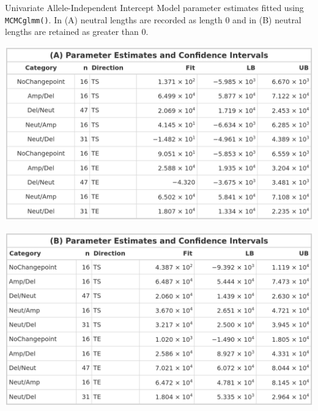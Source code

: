 \begin{table}[!htb]
    \caption[Univariate Allele-Independent Intercept Model parameter estimates fitted using \texttt{MCMCglmm()}.]{Univariate Allele-Independent Intercept Model parameter estimates fitted using \texttt{MCMCglmm()}. In (A) neutral lengths are recorded as length 0 and in (B) neutral lengths are retained as greater than 0.}
     \begin{subtable}[t]{.49\textwidth}
      \centering
      \includegraphics[width = 1\textwidth]{../tables/Chapter_5/Univariate_MCMC_7_AI_Pred.png}
    \end{subtable}%
    \hspace{0.5cm}
     \begin{subtable}[t]{.49\textwidth}
      \centering
         \includegraphics[width = 1\textwidth]{../tables/Chapter_5/Univariate_MCMC_7_Neut_AI_Pred.png}
    \end{subtable} 
\end{table}

